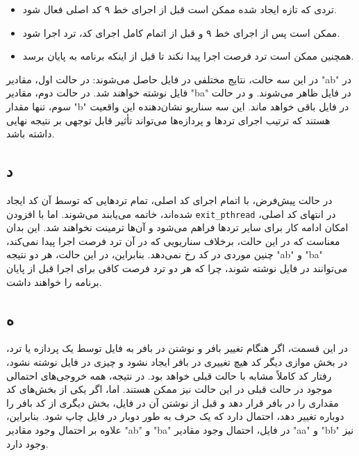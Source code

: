 \begin{itemize}
    \item تردی که تازه ایجاد شده ممکن است قبل از اجرای خط ۹ کد اصلی فعال شود.
    \item ممکن است پس از اجرای خط ۹ و قبل از اتمام کامل اجرای کد، ترد اجرا شود.
    \item همچنین ممکن است ترد فرصت اجرا پیدا نکند تا قبل از اینکه برنامه به پایان برسد.
\end{itemize}

در این سه حالت، نتایج مختلفی در فایل حاصل می‌شوند: در حالت اول، مقادیر "ab" در فایل نوشته خواهند شد. در حالت دوم، مقادیر "ba" در فایل ظاهر می‌شوند. و در حالت سوم، تنها مقدار "b" در فایل باقی خواهد ماند. این سه سناریو نشان‌دهنده این واقعیت هستند که ترتیب اجرای تردها و پردازه‌ها می‌تواند تأثیر قابل توجهی بر نتیجه نهایی داشته باشد.

\subsection*{د}
در حالت پیش‌فرض، با اتمام اجرای کد اصلی، تمام تردهایی که توسط آن کد ایجاد شده‌اند، خاتمه می‌یابند  می‌شوند. اما با افزودن \verb|exit_pthread| در انتهای کد اصلی، امکان ادامه کار برای سایر تردها فراهم می‌شود و آن‌ها ترمینت نخواهند شد. این بدان معناست که در این حالت، برخلاف سناریویی که در آن ترد فرصت اجرا پیدا نمی‌کند، چنین موردی در کد رخ نمی‌دهد. بنابراین، در این حالت، هر دو نتیجه "ab" و "ba" می‌توانند در فایل نوشته شوند، چرا که هر دو ترد فرصت کافی برای اجرا قبل از پایان برنامه را خواهند داشت.

\subsection*{ه}
در این قسمت، اگر هنگام تغییر بافر و نوشتن در بافر به فایل توسط یک پردازه یا ترد، در بخش موازی دیگر کد هیچ تغییری در بافر ایجاد نشود و چیزی در فایل نوشته نشود، رفتار کد کاملاً مشابه با حالت قبلی خواهد بود. در نتیجه، همه خروجی‌های احتمالی موجود در حالت قبلی در این حالت نیز ممکن هستند. اما، اگر یکی از بخش‌های کد مقداری را در بافر قرار دهد و قبل از نوشتن آن در فایل، بخش دیگری از کد بافر را دوباره تغییر دهد، احتمال دارد که یک حرف به طور دوبار در فایل چاپ شود. بنابراین، علاوه بر احتمال وجود مقادیر "ab" و "ba" در فایل، احتمال وجود مقادیر "aa" و "bb" نیز وجود دارد.